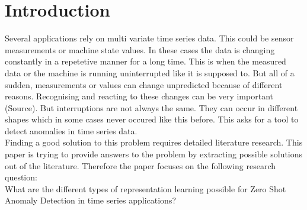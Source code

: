\chapter{Introduction}\label{intro}
Several applications rely on multi variate time series data. This could be sensor measurements or machine state values. In these cases the data is changing constantly in a repetetive manner for a long time. This is when the measured data or the machine is running uninterrupted like it is supposed to. But all of a sudden, measurements or values can change unpredicted because of different reasons. Recognising and reacting to these changes can be very important (Source). But interruptions are not always the same. They can occur in different shapes which in some cases never occured like this before. This asks for a tool to detect anomalies in time series data.\\
Finding a good solution to this problem requires detailed literature research. This paper is trying to provide answers to the problem by extracting possible solutions out of the literature. Therefore the paper focuses on the following research question:\\
What are the different types of representation learning possible for Zero Shot Anomaly Detection in time series applications?\\

